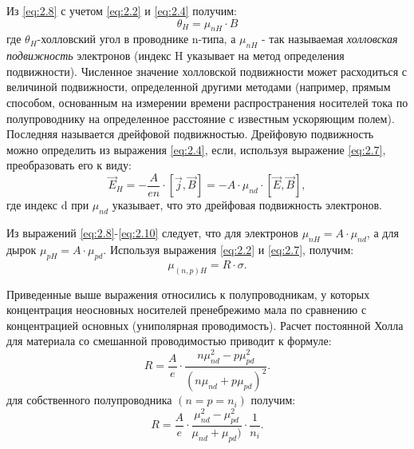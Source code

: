 Из \ref{eq:2.8} с учетом \ref{eq:2.2} и \ref{eq:2.4} получим:
\begin{equation}
\label{eq:2.9}
	\theta_H = \mu_{nH} \cdot B
\end{equation}
где $\theta_H$-холловский угол в проводнике n-типа, а $\mu_{nH}$ - так называемая \textit{холловская подвижность} электронов (индекс H указывает на метод определения подвижности). Численное значение холловской подвижности может расходиться с величиной подвижности, определенной другими методами (например, прямым способом, основанным на измерении времени распространения носителей тока по полупроводнику на определенное расстояние с известным ускоряющим полем). Последняя называется дрейфовой подвижностью. Дрейфовую подвижность можно определить из выражения \ref{eq:2.4}, если, используя выражение \ref{eq:2.7}, преобразовать его к виду:
\begin{equation}
\label{eq:2.10}
	\vec E_H = -\frac{A}{en}\cdot[\vec j, \vec B]=-A\cdot \mu_{nd} \cdot [\vec E,\vec B],
\end{equation}
где индекс d при $\mu_{nd}$ указывает, что это дрейфовая подвижность электронов.

Из выражений \eqref{eq:2.8}-\eqref{eq:2.10} следует, что для электронов $\mu_{nH}=A\cdot \mu_{nd}$, а для дырок $\mu_{pH}=A\cdot \mu_{pd}$. Используя выражения \eqref{eq:2.2} и \eqref{eq:2.7}, получим:
\begin{equation}
\label{eq:2.11}
	\mu_{(n,p)H}=R\cdot \sigma.
\end{equation}

Приведенные выше выражения относились к полупроводникам, у которых концентрация неосновных носителей пренебрежимо мала по сравнению с концентрацией основных (униполярная проводимость). Расчет постоянной Холла для материала со смешанной проводимостью приводит к формуле:
\begin{equation}
\label{eq:2.12}
	R= \frac{A}{e}\cdot \frac{n\mu^2_{nd}-p\mu^2_{pd}}{(n\mu_{nd}+p\mu_{pd})^2}.
\end{equation}
для собственного полупроводника $(n=p=n_i)$ получим:
\begin{equation}
\label{eq:2.12}
	R= \frac{A}{e}\cdot \frac{\mu^2_{nd}-\mu^2_{pd}}{\mu_{nd}+\mu_{pd})}\cdot \frac{1}{n_i}.
\end{equation}


